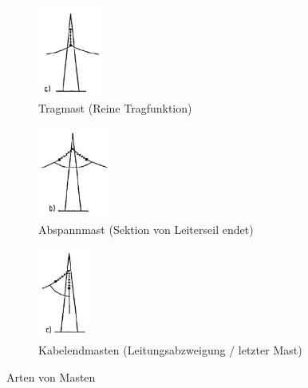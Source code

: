 \begin{figure}[H]
    \centering
    \begin{subfigure}[t]{0.2\textwidth}
        \centering
        \includegraphics[height=3cm]{images/08-Freileitungen/Tragmast.png}
        \caption[Tragmast]{Tragmast (Reine Tragfunktion)}
    \end{subfigure}
    \hspace{1cm}
    \begin{subfigure}[t]{0.2\textheight}
        \centering
        \includegraphics[height=3cm]{images/08-Freileitungen/Abspannmast.png}
        \caption[Abspannmast]{Abspannmast (Sektion von Leiterseil endet)}
    \end{subfigure}
    \hspace{1cm}
    \begin{subfigure}[t]{0.2\textwidth}
        \centering
        \includegraphics[height=3cm]{images/08-Freileitungen/Kabelendmasten.png}
        \caption[Kabelendmasten]{Kabelendmasten (Leitungsabzweigung / letzter Mast)}
    \end{subfigure}
    \caption[Arten von Masten]{Arten von Masten}
\end{figure}

